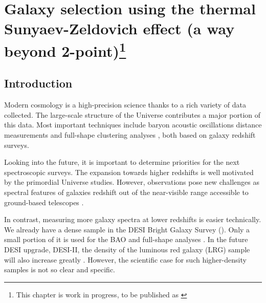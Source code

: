 \chapter{Galaxy selection using the thermal Sunyaev-Zeldovich effect (a way beyond 2-point)\texorpdfstring{\footnote{This chapter is work in progress, to be published as \cite{tSZ-selection-DESI-LRGs}}}{}}
\label{ch:tSZ-selection-LRG}
\graphicspath{{tSZ-selection-LRG/}}

\section{Introduction}

Modern cosmology is a high-precision science thanks to a rich variety of data collected.
The large-scale structure of the Universe contributes a major portion of this data.
Most important techniques include baryon acoustic oscillations distance measurements \citep[e.g.,][]{DESI.DR2.BAO.lya,DESI.DR2.BAO.cosmo} and full-shape clustering analyses \citep{DESI2024.V.KP5,DESI2024.VII.KP7B}, both based on galaxy redshift surveys.

Looking into the future, it is important to determine priorities for the next spectroscopic surveys.
The expansion towards higher redshifts is well motivated by the primordial Universe studies.
However, observations pose new challenges as spectral features of galaxies redshift out of the near-visible range accessible to ground-based telescopes \citep{snowmass2021-high-z-LSS}.

In contrast, measuring more galaxy spectra at lower redshifts is easier technically.
We already have a dense sample in the DESI Bright Galaxy Survey (\cite{BGS.TS.Hahn.2023}).
Only a small portion of it is used for the BAO and full-shape analyses \citep{DESI2024.III.KP4,DESI2024.V.KP5,DESI.DR2.BAO.cosmo}.
In the future DESI upgrade, DESI-II, the density of the luminous red galaxy (LRG) sample will also increase greatly \citep{spectroscopic-roadmap-cosmic-frontier}.
However, the scientific case for such higher-density samples is not so clear and specific.

